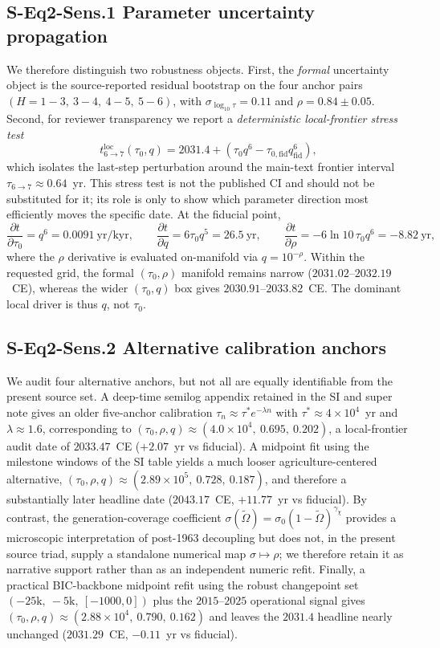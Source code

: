 \documentclass[11pt]{article}
\begin{document}
\subsection*{S-Eq2-Sens.1 Parameter uncertainty propagation}
\label{sec:S-Eq2-Sens.1}

We therefore distinguish two robustness objects. First, the \emph{formal}
uncertainty object is the source-reported residual bootstrap on the four
anchor pairs $(H{=}1{-}3,\ 3{-}4,\ 4{-}5,\ 5{-}6)$, with
$\sigma_{\log_{10}\tau}=0.11$ and $\rho=0.84\pm0.05$.
Second, for reviewer transparency we report a \emph{deterministic
local-frontier stress test}
\[t_{6\to 7}^{\mathrm{loc}}(\tau_0,q)=2031.4
  +\left(\tau_0 q^6-\tau_{0,\mathrm{fid}}q_{\mathrm{fid}}^6\right),\]
which isolates the last-step perturbation around the main-text frontier
interval $\tau_{6\to 7}\approx 0.64$~yr. This stress test is not the
published CI and should not be substituted for it; its role is only to show
which parameter direction most efficiently moves the specific date.
At the fiducial point,
\[\frac{\partial t}{\partial \tau_0}=q^6=0.0091~\mathrm{yr/kyr},\qquad
  \frac{\partial t}{\partial q}=6\tau_0 q^5=26.5~\mathrm{yr},\qquad
  \frac{\partial t}{\partial \rho}=-6\ln 10\,\tau_0 q^6=-8.82~\mathrm{yr},\]
where the $\rho$ derivative is evaluated on-manifold via $q=10^{-\rho}$.
Within the requested grid, the formal $(\tau_0,\rho)$ manifold remains
narrow ($2031.02$--$2032.19$~CE), whereas the wider $(\tau_0,q)$ box
gives $2030.91$--$2033.82$~CE. The dominant local driver is thus $q$, not
$\tau_0$.

\subsection*{S-Eq2-Sens.2 Alternative calibration anchors}
\label{sec:S-Eq2-Sens.2}

We audit four alternative anchors, but not all are equally identifiable from
the present source set. A deep-time semilog appendix retained in the SI and
super note gives an older five-anchor calibration
$\tau_n\approx \tau^* e^{-\lambda n}$ with $\tau^*\approx 4\times 10^4$~yr
and $\lambda\approx 1.6$, corresponding to
$(\tau_0,\rho,q)\approx(4.0\times 10^4,\ 0.695,\ 0.202)$, a local-frontier
audit date of $2033.47$~CE (${+}2.07$~yr vs fiducial).
A midpoint fit using the milestone windows of the SI table yields a much
looser agriculture-centered alternative,
$(\tau_0,\rho,q)\approx(2.89\times 10^5,\ 0.728,\ 0.187)$,
and therefore a substantially later headline date ($2043.17$~CE,
${+}11.77$~yr vs fiducial). By contrast, the generation-coverage coefficient
$\sigma(\tilde\Omega)=\sigma_0(1-\tilde\Omega)^{\gamma_\chi}$ provides a
microscopic interpretation of post-1963 decoupling but does not, in the
present source triad, supply a standalone numerical map
$\sigma\mapsto\rho$; we therefore retain it as narrative support rather
than as an independent numeric refit. Finally, a practical BIC-backbone
midpoint refit using the robust changepoint set
$(-25\text{k},\ -5\text{k},\ [-1000,0])$ plus the $2015$--$2025$
operational signal gives
$(\tau_0,\rho,q)\approx(2.88\times 10^4,\ 0.790,\ 0.162)$ and leaves the
$2031.4$ headline nearly unchanged ($2031.29$~CE, ${-}0.11$~yr vs
fiducial).
\end{document}
